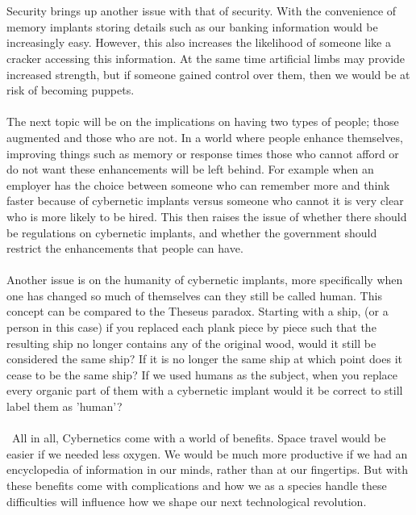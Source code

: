 \documentclass[12pt,a4paper,notitlepage]{article}
\begin{document}
\\\\
Security brings up another issue with that of security. With the convenience of
memory implants storing details such as our banking information would be
increasingly easy. However, this also increases the likelihood of someone like a
cracker accessing this information. At the same time artificial limbs may
provide increased strength, but if someone gained control over them, then we
would be at risk of becoming puppets.
\\\\
The next topic will be on the implications on having two types of people; those
augmented and those who are not. In a world where people enhance themselves,
improving things such as memory or response times those who cannot afford or do
not want these enhancements will be left behind. For example when an employer
has the choice between someone who can remember more and think faster because of
cybernetic implants versus someone who cannot it is very clear who is more
likely to be hired. This then raises the issue of whether there should be
regulations on cybernetic implants, and whether the government should restrict
the enhancements that people can have. 
\\\\
Another issue is on the humanity of cybernetic implants, more specifically when
one has changed so much of themselves can they still be called human. This
concept can be compared to the Theseus paradox. Starting with a ship, (or a
person in this case) if you replaced each plank piece by piece such that the
resulting ship no longer contains any of the original wood, would it still be
considered the same ship? If it is no longer the same ship at which point does
it cease to be the same ship? If we used humans as the subject, when you replace
every organic part of them with a cybernetic implant would it be correct to
still label them as 'human'?
\\\\\
All in all, Cybernetics come with a world of benefits. Space travel would be
easier if we needed less oxygen. We would be much more productive if we had an
encyclopedia of information in our minds, rather than at our fingertips. But
with these benefits come with complications and how we as a species handle these
difficulties will influence how we shape our next technological revolution.
\newpage
\end{document}
